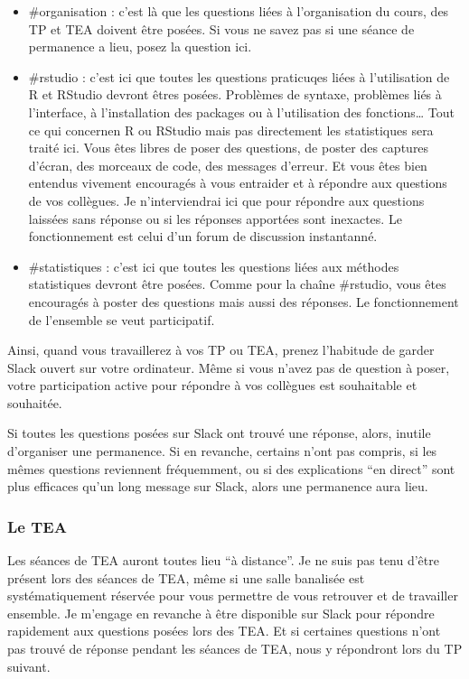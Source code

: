 \documentclass[a4paperpaper,]{article}
\providecommand{\tightlist}{%
  \setlength{\itemsep}{0pt}\setlength{\parskip}{0pt}}
\theoremstyle{definition}
\theoremstyle{definition}
\theoremstyle{definition}
\theoremstyle{remark}
\begin{document}
\begin{itemize}
\tightlist
\item
  \#organisation : c'est là que les questions liées à l'organisation du
  cours, des TP et TEA doivent être posées. Si vous ne savez pas si une
  séance de permanence a lieu, posez la question ici.
\item
  \#rstudio : c'est ici que toutes les questions praticuqes liées à
  l'utilisation de R et RStudio devront êtres posées. Problèmes de
  syntaxe, problèmes liés à l'interface, à l'installation des packages
  ou à l'utilisation des fonctions\ldots{} Tout ce qui concernen R ou
  RStudio mais pas directement les statistiques sera traité ici. Vous
  êtes libres de poser des questions, de poster des captures d'écran,
  des morceaux de code, des messages d'erreur. Et vous êtes bien
  entendus vivement encouragés à vous entraider et à répondre aux
  questions de vos collègues. Je n'interviendrai ici que pour répondre
  aux questions laissées sans réponse ou si les réponses apportées sont
  inexactes. Le fonctionnement est celui d'un forum de discussion
  instantanné.
\item
  \#statistiques : c'est ici que toutes les questions liées aux méthodes
  statistiques devront être posées. Comme pour la chaîne \#rstudio, vous
  êtes encouragés à poster des questions mais aussi des réponses. Le
  fonctionnement de l'ensemble se veut participatif.
\end{itemize}

Ainsi, quand vous travaillerez à vos TP ou TEA, prenez l'habitude de
garder Slack ouvert sur votre ordinateur. Même si vous n'avez pas de
question à poser, votre participation active pour répondre à vos
collègues est souhaitable et souhaitée.

Si toutes les questions posées sur Slack ont trouvé une réponse, alors,
inutile d'organiser une permanence. Si en revanche, certains n'ont pas
compris, si les mêmes questions reviennent fréquemment, ou si des
explications ``en direct'' sont plus efficaces qu'un long message sur
Slack, alors une permanence aura lieu.

\subsubsection{Le TEA}\label{le-tea}

Les séances de TEA auront toutes lieu ``à distance''. Je ne suis pas
tenu d'être présent lors des séances de TEA, même si une salle banalisée
est systématiquement réservée pour vous permettre de vous retrouver et
de travailler ensemble. Je m'engage en revanche à être disponible sur
Slack pour répondre rapidement aux questions posées lors des TEA. Et si
certaines questions n'ont pas trouvé de réponse pendant les séances de
TEA, nous y répondront lors du TP suivant.
\end{document}
